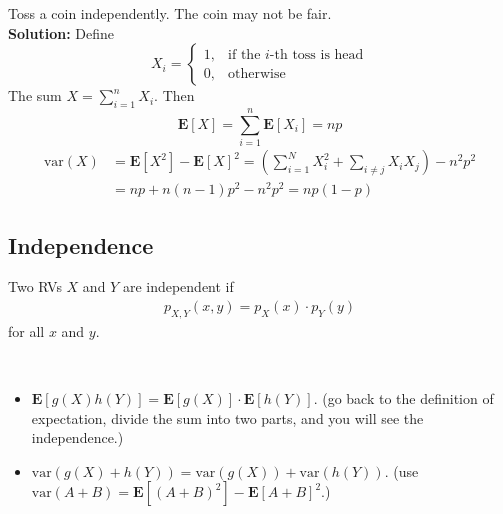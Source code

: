 \begin{example}
    Toss a coin independently. The coin may not be fair. \\ 
    \textbf{Solution:} Define 
    \begin{equation}
        X_i = \begin{cases}
            1, & \text{if the $i$-th toss is head} \\ 
            0, & \text{otherwise}
        \end{cases}
    \end{equation}
    The sum $X = \sum_{i=1}^n X_i$. Then 
    \begin{equation}
        \mathbf{E}[X] = \sum_{i=1}^n \mathbf{E}[X_i] = np
    \end{equation}
    \begin{equation}
    \begin{aligned}
        \text{var}(X) &= \mathbf{E}[X^2] - \mathbf{E}[X]^2 = (\sum_{i=1}^{N} X_i^2 + \sum_{i \neq j} X_i X_j) - n^2 p^2 \\
        &= np + n(n-1)p^2 - n^2 p^2 = np(1-p)
    \end{aligned}
    \end{equation}
\end{example}

\subsection{Independence}
\begin{definition}
    Two RVs $X$ and $Y$ are independent if
    \begin{align}
        p_{X, Y}(x, y) = p_{X}(x) \cdot p_{Y}(y)
    \end{align}
    for all $x$ and $y$.
\end{definition}
\begin{property} ~
    \begin{itemize}
        \item $\mathbf{E}[g(X)h(Y)] = \mathbf{E}[g(X)] \cdot \mathbf{E}[h(Y)]$. (go back to the definition of expectation, divide the sum into two parts, and you will see the independence.)
        \item $\text{var}(g(X) + h(Y)) = \text{var}(g(X)) + \text{var}(h(Y))$. (use $\text{var}(A + B) = \mathbf{E}[(A + B)^2] - \mathbf{E}[A + B]^2$.)
    \end{itemize}
\end{property}

